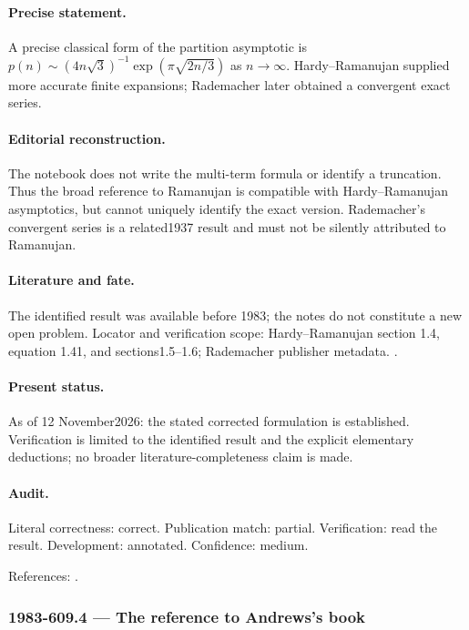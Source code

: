 \paragraph{Precise statement.} A precise classical form of the partition asymptotic is \(p(n)\sim(4n\sqrt3)^{-1}\exp(\pi\sqrt{2n/3})\) as \(n\to\infty\). Hardy--Ramanujan supplied more accurate finite expansions; Rademacher later obtained a convergent exact series.

\paragraph{Editorial reconstruction.} The notebook does not write the multi-term formula or identify a truncation. Thus the broad reference to Ramanujan is compatible with Hardy--Ramanujan asymptotics, but cannot uniquely identify the exact version. Rademacher's convergent series is a related1937 result and must not be silently attributed to Ramanujan.

\paragraph{Literature and fate.} The identified result was available before 1983; the notes do not constitute a new open problem. Locator and verification scope: Hardy--Ramanujan section 1.4, equation 1.41, and sections1.5--1.6; Rademacher publisher metadata. \cite{hardyramanujan1918asymptotic,rademacher1937partition}.

\paragraph{Present status.} As of 12 November2026: the stated corrected formulation is established. Verification is limited to the identified result and the explicit elementary deductions; no broader literature-completeness claim is made.

\paragraph{Audit.} Literal correctness: correct. Publication match: partial. Verification: read the result. Development: annotated. Confidence: medium.

\noindent References: \citep{hardyramanujan1918asymptotic,rademacher1937partition}.\par

\subsubsection{1983-609.4 --- The reference to Andrews's book}

